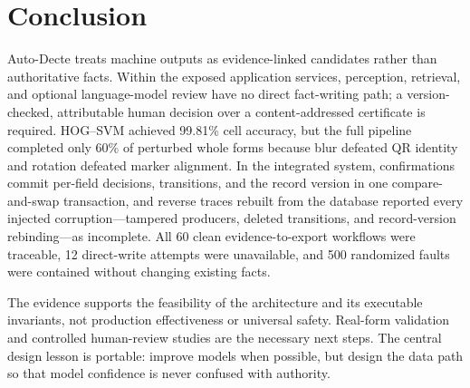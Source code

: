 \section{Conclusion}
\label{sec:conclusion}

Auto-Decte treats machine outputs as evidence-linked candidates rather than authoritative facts. Within the exposed application services, perception, retrieval, and optional language-model review have no direct fact-writing path; a version-checked, attributable human decision over a content-addressed certificate is required. HOG--SVM achieved 99.81\% cell accuracy, but the full pipeline completed only 60\% of perturbed whole forms because blur defeated QR identity and rotation defeated marker alignment. In the integrated system, confirmations commit per-field decisions, transitions, and the record version in one compare-and-swap transaction, and reverse traces rebuilt from the database reported every injected corruption---tampered producers, deleted transitions, and record-version rebinding---as incomplete. All 60 clean evidence-to-export workflows were traceable, 12 direct-write attempts were unavailable, and 500 randomized faults were contained without changing existing facts.

The evidence supports the feasibility of the architecture and its executable invariants, not production effectiveness or universal safety. Real-form validation and controlled human-review studies are the necessary next steps. The central design lesson is portable: improve models when possible, but design the data path so that model confidence is never confused with authority.
